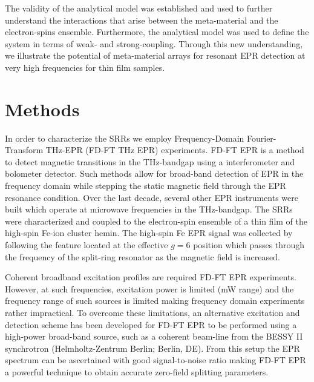 The validity of the analytical model was established and used to further understand the interactions that arise between the meta-material and the electron-spins ensemble. Furthermore, the analytical model was used to define the system in terms of weak- and strong-coupling. Through this new understanding, we illustrate the potential of meta-material arrays for resonant EPR detection at very high frequencies for thin film samples. 

\section{Methods}
In order to characterize the SRRs we employ Frequency-Domain Fourier-Transform THz-EPR (FD-FT THz EPR) experiments. FD-FT EPR is a method to detect magnetic transitions in the THz-bandgap using a interferometer and bolometer detector. \cite{Schnegg09,NEHRKORN201710} Such methods allow for broad-band detection of EPR in the frequency domain while stepping the static magnetic field through the EPR resonance condition. Over the last decade, several other EPR instruments were built which operate at microwave frequencies in the THz-bandgap. \cite{Disselhorst95, Hassan00, vanTol05, Zvyagin09, Takahashi09, C7CP07443C, Lu2017} The SRRs were characterized and coupled to the electron-spin ensemble of a thin film of the high-spin Fe-ion cluster hemin. The high-spin Fe EPR signal was collected by following the feature located at the effective $g=6$ position which passes through the frequency of the split-ring resonator as the magnetic field is increased. 

Coherent broadband excitation profiles are required FD-FT EPR experiments. However, at such frequencies, excitation power is limited (mW range) and the frequency range of such sources is limited making frequency domain experiments rather impractical. To overcome these limitations, an alternative excitation and detection scheme has been developed for FD-FT EPR to be performed using a high-power broad-band source, such as a coherent beam-line from the BESSY II synchrotron (Helmholtz-Zentrum Berlin; Berlin, DE). From this setup the EPR spectrum can be ascertained with good signal-to-noise ratio making FD-FT EPR a powerful technique to obtain accurate zero-field splitting parameters. \cite{Nehrkorn13,Nehrkorn15,NEHRKORN201710}

